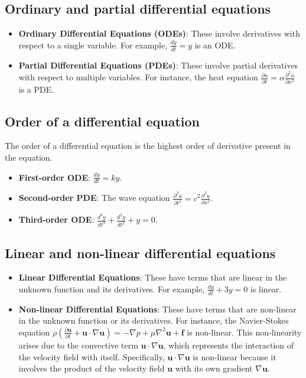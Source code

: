 \documentclass{article}
\begin{document}
\subsection{Ordinary and partial differential equations}
\begin{itemize}
    \item \textbf{Ordinary Differential Equations (ODEs)}: These involve derivatives with respect to a single variable. For example, \( \frac{dy}{dt} = y \) is an ODE.
    \item \textbf{Partial Differential Equations (PDEs)}: These involve partial derivatives with respect to multiple variables. For instance, the heat equation \( \frac{\partial u}{\partial t} = \alpha \frac{\partial^2 u}{\partial x^2} \) is a PDE.
\end{itemize}

\subsection{Order of a differential equation}
The order of a differential equation is the highest order of derivative present in the equation.
\begin{itemize}
    \item \textbf{First-order ODE}: \( \frac{dy}{dt} = ky \).
    \item \textbf{Second-order PDE}: The wave equation \( \frac{\partial^2 u}{\partial t^2} = c^2 \frac{\partial^2 u}{\partial x^2} \).
    \item \textbf{Third-order ODE}: \( \frac{d^3 y}{dt^3} + \frac{d^2 y}{dt^2} + y = 0 \).
\end{itemize}

\subsection{Linear and non-linear differential equations}
\begin{itemize}
    \item \textbf{Linear Differential Equations}: These have terms that are linear in the unknown function and its derivatives. For example, \( \frac{dy}{dt} + 3y = 0 \) is linear.
    \item \textbf{Non-linear Differential Equations}: These have terms that are non-linear in the unknown function or its derivatives. For instance, the Navier-Stokes equation \( \rho \left( \frac{\partial \mathbf{u}}{\partial t} + \mathbf{u} \cdot \nabla \mathbf{u} \right) = -\nabla p + \mu \nabla^2 \mathbf{u} + \mathbf{f} \) is non-linear. This non-linearity arises due to the convective term \( \mathbf{u} \cdot \nabla \mathbf{u} \), which represents the interaction of the velocity field with itself. Specifically, \( \mathbf{u} \cdot \nabla \mathbf{u} \) is non-linear because it involves the product of the velocity field \( \mathbf{u} \) with its own gradient \( \nabla \mathbf{u} \).
\end{itemize}
\end{document}
